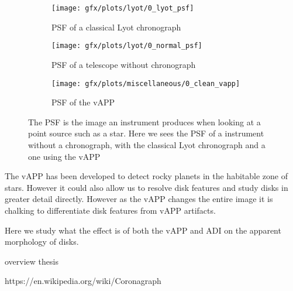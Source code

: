 \begin{figure}[h!]
      \begin{subfigure}[t]{0.5 \textwidth}
        \texttt{[image: gfx/plots/lyot/0\_lyot\_psf]}
        \label{fig:lyot}
        \caption{PSF of a classical Lyot chronograph}
      \end{subfigure}%
      \begin{subfigure}[t]{0.5\textwidth}
        \texttt{[image: gfx/plots/lyot/0\_normal\_psf]}
        \caption{PSF of a telescope without chronograph}
        \label{fig:classic_psf}
      \end{subfigure}
      
      \begin{subfigure}[]{0.5\textwidth}
        \texttt{[image: gfx/plots/miscellaneous/0\_clean\_vapp]}
        \caption{PSF of the vAPP}
      \end{subfigure}
      
  \caption{The \ac{PSF} is the image an instrument produces when looking at a point source such as a star. Here we sees the \ac{PSF} of a instrument without a chronograph, with the classical Lyot chronograph and a one using the vAPP }
  \label{fig:vapp_vs_lyot}
\end{figure}

The \ac{vAPP} has been developed to detect rocky planets in the habitable zone of stars. However it could also allow us to resolve disk features and study disks in greater detail directly. However as the \ac{vAPP} changes the entire image it is chalking to differentiate disk features from \ac{vAPP} artifacts. 

Here we study what the effect is of both the \ac{vAPP} and \ac{ADI} on the apparent morphology of disks.


overview thesis


https://en.wikipedia.org/wiki/Coronagraph
